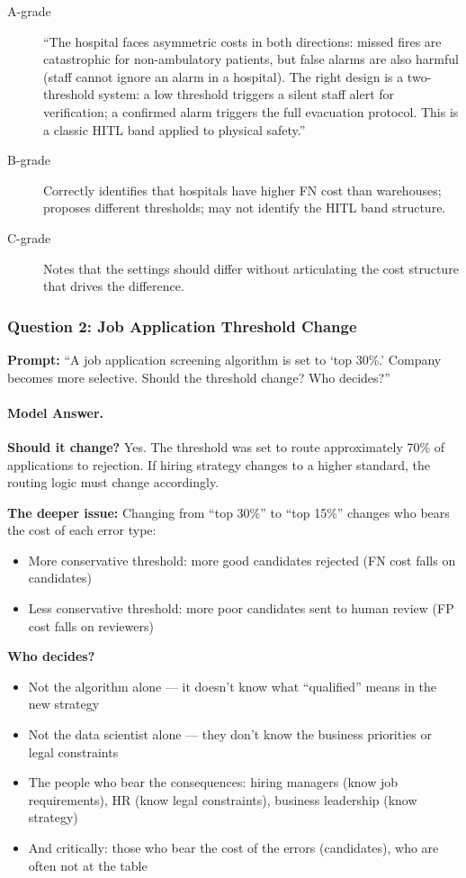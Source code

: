 \begin{description}
    \item[A-grade] ``The hospital faces asymmetric costs in both directions: missed fires are catastrophic for non-ambulatory patients, but false alarms are also harmful (staff cannot ignore an alarm in a hospital). The right design is a two-threshold system: a low threshold triggers a silent staff alert for verification; a confirmed alarm triggers the full evacuation protocol. This is a classic HITL band applied to physical safety.''

    \item[B-grade] Correctly identifies that hospitals have higher FN cost than warehouses; proposes different thresholds; may not identify the HITL band structure.

    \item[C-grade] Notes that the settings should differ without articulating the cost structure that drives the difference.
\end{description}

\subsubsection{Question 2: Job Application Threshold Change}

\textbf{Prompt:} ``A job application screening algorithm is set to `top 30\%.' Company becomes more selective. Should the threshold change? Who decides?''

\paragraph{Model Answer.}

\textbf{Should it change?} Yes. The threshold was set to route approximately 70\% of applications to rejection. If hiring strategy changes to a higher standard, the routing logic must change accordingly.

\textbf{The deeper issue:} Changing from ``top 30\%'' to ``top 15\%'' changes who bears the cost of each error type:
\begin{itemize}
    \item More conservative threshold: more good candidates rejected (FN cost falls on candidates)
    \item Less conservative threshold: more poor candidates sent to human review (FP cost falls on reviewers)
\end{itemize}

\textbf{Who decides?}
\begin{itemize}
    \item Not the algorithm alone --- it doesn't know what ``qualified'' means in the new strategy
    \item Not the data scientist alone --- they don't know the business priorities or legal constraints
    \item The people who bear the consequences: hiring managers (know job requirements), HR (know legal constraints), business leadership (know strategy)
    \item And critically: those who bear the cost of the errors (candidates), who are often not at the table
\end{itemize}

